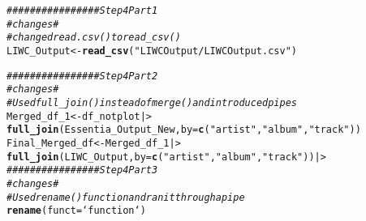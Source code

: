 \documentclass{article}\usepackage[]{graphicx}\usepackage[]{xcolor}
\makeatletter
\newcommand{\hlsng}[1]{\textcolor[rgb]{0.192,0.494,0.8}{#1}}%
\newcommand{\hlcom}[1]{\textcolor[rgb]{0.678,0.584,0.686}{\textit{#1}}}%
\newcommand{\hldef}[1]{\textcolor[rgb]{0.345,0.345,0.345}{#1}}%
\newcommand{\hlkwb}[1]{\textcolor[rgb]{0.69,0.353,0.396}{#1}}%
\newcommand{\hlkwc}[1]{\textcolor[rgb]{0.333,0.667,0.333}{#1}}%
\newcommand{\hlkwd}[1]{\textcolor[rgb]{0.737,0.353,0.396}{\textbf{#1}}}%
\newenvironment{kframe}{%
 \def\at@end@of@kframe{}%
 \ifinner\ifhmode%
  \def\at@end@of@kframe{\end{minipage}}%
  \begin{minipage}{\columnwidth}%
 \fi\fi%
 \def\FrameCommand##1{\hskip\@totalleftmargin \hskip-\fboxsep
 \colorbox{shadecolor}{##1}\hskip-\fboxsep
     \hskip-\linewidth \hskip-\@totalleftmargin \hskip\columnwidth}%
 \MakeFramed {\advance\hsize-\width
   \@totalleftmargin\z@ \linewidth\hsize
   \@setminipage}}%
 {\par\unskip\endMakeFramed%
 \at@end@of@kframe}
\newenvironment{knitrout}{}{} %
\makeatother
\begin{document}
\begin{enumerate}
\begin{knitrout}
\begin{kframe}
\begin{alltt}
\hlcom{################ Step 4 Part 1}
\hlcom{#changes#}
\hlcom{#changed read.csv() to read_csv()}
\hldef{LIWC_Output} \hlkwb{<-} \hlkwd{read_csv}\hldef{(}\hlsng{"LIWCOutput/LIWCOutput.csv"}\hldef{)}

\hlcom{################ Step 4 Part 2}
\hlcom{#changes#}
\hlcom{#Used full_join() instead of merge() and introduced pipes}
\hldef{Merged_df_1} \hlkwb{<-} \hldef{df_notplot |>}
  \hlkwd{full_join}\hldef{(Essentia_Output_New,} \hlkwc{by} \hldef{=} \hlkwd{c}\hldef{(}\hlsng{"artist"}\hldef{,} \hlsng{"album"}\hldef{,} \hlsng{"track"}\hldef{))}
\hldef{Final_Merged_df} \hlkwb{<-} \hldef{Merged_df_1 |>}
  \hlkwd{full_join}\hldef{(LIWC_Output,} \hlkwc{by} \hldef{=} \hlkwd{c}\hldef{(}\hlsng{"artist"}\hldef{,} \hlsng{"album"}\hldef{,} \hlsng{"track"}\hldef{)) |>}
\hlcom{################ Step 4 Part 3}
\hlcom{#changes#}
\hlcom{#Used rename() function and ran it through a pipe}
    \hlkwd{rename}\hldef{(}\hlkwc{funct} \hldef{= `function`)}
\end{alltt}
\end{kframe}
\end{knitrout}
\nocite{jsonlite}
\end{enumerate}

\end{document}
